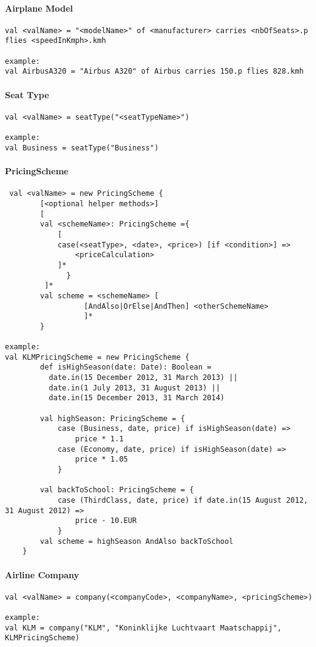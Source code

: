  \paragraph{Airplane Model}\hfill
\begin{lstlisting}
val <valName> = "<modelName>" of <manufacturer> carries <nbOfSeats>.p flies <speedInKmph>.kmh

example:
val AirbusA320 = "Airbus A320" of Airbus carries 150.p flies 828.kmh
\end{lstlisting}

 \paragraph{Seat Type}\hfill
\begin{lstlisting}
val <valName> = seatType("<seatTypeName>")

example:
val Business = seatType("Business")
\end{lstlisting}

\paragraph{PricingScheme}\hfill
\begin{lstlisting}
 val <valName> = new PricingScheme {
		[<optional helper methods>]
		[
		val <schemeName>: PricingScheme ={
			[
			case(<seatType>, <date>, <price>) [if <condition>] =>
			    <priceCalculation>
			]*
		      }
		 ]*
		val scheme = <schemeName> [
			      [AndAlso|OrElse|AndThen] <otherSchemeName>
				  ]*
		}
	
example:
val KLMPricingScheme = new PricingScheme {
		def isHighSeason(date: Date): Boolean =
		  date.in(15 December 2012, 31 March 2013) ||
		  date.in(1 July 2013, 31 August 2013) ||
		  date.in(15 December 2013, 31 March 2014)

		val highSeason: PricingScheme = {
			case (Business, date, price) if isHighSeason(date) =>
			    price * 1.1
			case (Economy, date, price) if isHighSeason(date) =>
			    price * 1.05
			}
			    
		val backToSchool: PricingScheme = {
			case (ThirdClass, date, price) if date.in(15 August 2012, 31 August 2012) =>
			    price - 10.EUR
			}
		val scheme = highSeason AndAlso backToSchool
	}
\end{lstlisting}

\paragraph{Airline Company}\hfill
\begin{lstlisting}
val <valName> = company(<companyCode>, <companyName>, <pricingScheme>)

example:
val KLM = company("KLM", "Koninklijke Luchtvaart Maatschappij", KLMPricingScheme)
\end{lstlisting}
	    

